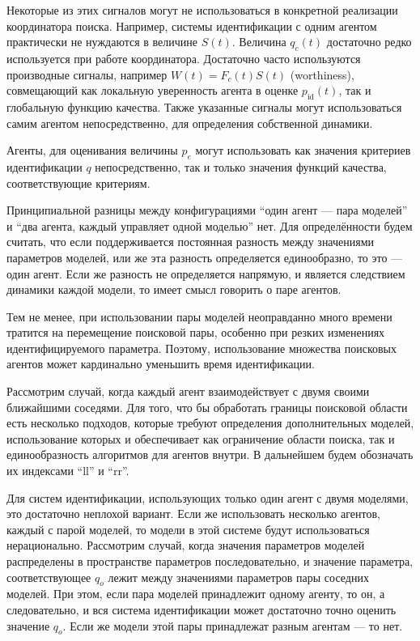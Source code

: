 Некоторые из этих сигналов могут не использоваться в конкретной реализации
координатора поиска. Например, системы идентификации с одним агентом
практически не нуждаются в величине $S(t)$. Величина $q_c(t)$
достаточно редко используется при работе координатора.
Достаточно часто используются производные сигналы,
например $W(t) = F_c(t) S(t)$ (worthiness), совмещающий как локальную
уверенность агента в оценке $p_\mathrm{id}(t)$,
так и глобальную функцию качества.
Также указанные сигналы могут использоваться самим агентом непосредственно,
для определения собственной динамики.


Агенты, для оценивания величины $p_e$
могут использовать как значения критериев идентификации $q$
непосредственно, так и только значения функций качества,
соответствующие критериям.

Принципиальной разницы между конфигурациями
``один агент --- пара моделей''
и
``два агента, каждый управляет одной моделью'' нет.
Для определённости будем считать, что если поддерживается
постоянная разность между значениями параметров моделей,
или же эта разность определяется единообразно,
то это --- один агент. Если же разность
не определяется напрямую, и является следствием динамики каждой модели,
то имеет смысл говорить о паре агентов.

Тем не менее, при использовании пары моделей неоправданно много времени
тратится на перемещение поисковой пары, особенно при резких изменениях
идентифицируемого параметра. Поэтому, использование множества
поисковых агентов может кардинально уменьшить время идентификации.


Рассмотрим случай, когда каждый агент взаимодействует с двумя своими ближайшими соседями.
Для того, что бы обработать границы поисковой области есть несколько подходов,
которые требуют определения дополнительных моделей, использование которых
и обеспечивает как ограничение области поиска, так и единообразность
алгоритмов для агентов внутри.
В дальнейшем будем обозначать их индексами ``ll'' и ``rr''.

Для систем идентификации, использующих только один агент с двумя моделями,
это достаточно неплохой вариант.
Если же использовать несколько агентов, каждый с парой моделей,
то модели в этой системе будут использоваться нерационально.
Рассмотрим случай, когда значения параметров моделей распределены в пространстве
параметров последовательно, и значение параметра, соответствующее $q_o$ лежит между значениями
параметров пары соседних моделей.
При этом, если пара моделей принадлежит одному агенту, то он,
а следовательно, и вся система идентификации может достаточно точно
оценить значение $q_o$. Если же модели этой пары
принадлежат разным агентам --- то нет.

